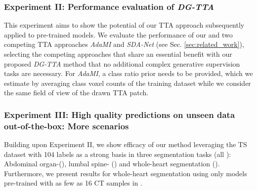         \subsubsection{Experiment II: Performance evaluation of \emph{DG-TTA}}
            \label{sec:exp2_description}
            This experiment aims to show the potential of our TTA approach subsequently applied to pre-trained models.
            We evaluate the performance of our and two competing TTA approaches \emph{AdaMI} and \emph{SDA-Net} (see Sec. \ref{sec:related_work}), selecting the competing approaches that share an essential benefit with our proposed \emph{DG-TTA} method that no additional complex generative supervision tasks are necessary.
            For \emph{AdaMI}, a class ratio prior needs to be provided, which we estimate by averaging class voxel counts of the training dataset while we consider the same field of view of the drawn TTA patch.

        \subsubsection{Experiment III: High quality predictions on unseen data out-of-the-box: More scenarios}
            \label{sec:exp3_description}
            Building upon Experiment II, we show efficacy of our method leveraging the TS dataset with 104 labels as a strong basis in three segmentation tasks (all ): Abdominal organ-(), lumbal spine- () and whole-heart segmentation ().
            Furthermore, we present results for whole-heart segmentation using only models pre-trained with as few as 16 CT samples in .

